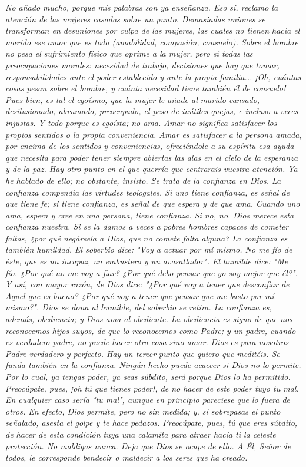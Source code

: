 \documentclass[12pt]{book} %
\begin{document}
\emph{No añado mucho, porque mis palabras son ya enseñanza. Eso sí, reclamo la atención de las mujeres casadas sobre un punto. Demasiadas uniones se transforman en desuniones por culpa de las mujeres, las cuales no tienen hacia el marido ese amor que es todo (amabilidad, compasión, consuelo). Sobre el hombre no pesa el sufrimiento físico que oprime a la mujer, pero sí todas las preocupaciones morales: necesidad de trabajo, decisiones que hay que tomar, responsabilidades ante el poder establecido y ante la propia familia... ¡Oh, cuántas cosas pesan sobre el hombre, y cuánta necesidad tiene también él de consuelo! Pues bien, es tal el egoísmo, que la mujer le añade al marido cansado, desilusionado, abrumado, preocupado, el peso de inútiles quejas, e incluso a veces injustas. Y todo porque es egoísta; no ama. Amar no significa satisfacer los propios sentidos o la propia conveniencia. Amar es satisfacer a la persona amada, por encima de los sentidos y conveniencias, ofreciéndole a su espíritu esa ayuda que necesita para poder tener siempre abiertas las alas en el cielo de la esperanza y de la paz. Hay otro punto en el que querría que centrarais vuestra atención. Ya he hablado de ello; no obstante, insisto. Se trata de la confianza en Dios. La confianza compendia las virtudes teologales. Si uno tiene confianza, es señal de que tiene fe; si tiene confianza, es señal de que espera y de que ama. Cuando uno ama, espera y cree en una persona, tiene confianza. Si no, no. Dios merece esta confianza nuestra. Si se la damos a veces a pobres hombres capaces de cometer faltas, ¿por qué negársela a Dios, que no comete falta alguna? La confianza es también humildad. El soberbio dice: "Voy a actuar por mí mismo. No me fío de éste, que es un incapaz, un embustero y un avasallador". El humilde dice: "Me fío. ¿Por qué no me voy a fiar? ¿Por qué debo pensar que yo soy mejor que él?". Y así, con mayor razón, de Dios dice: "¿Por qué voy a tener que desconfiar de Aquel que es bueno? ¿Por qué voy a tener que pensar que me basto por mí mismo?". Dios se dona al humilde, del soberbio se retira. La confianza es, además, obediencia; y Dios ama al obediente. La obediencia es signo de que nos reconocemos hijos suyos, de que lo reconocemos como Padre; y un padre, cuando es verdadero padre, no puede hacer otra cosa sino amar. Dios es para nosotros Padre verdadero y perfecto. Hay un tercer punto que quiero que meditéis. Se funda también en la confianza. Ningún hecho puede acaecer si Dios no lo permite. Por lo cual, ya tengas poder, ya seas súbdito, será porque Dios lo ha permitido. Preocúpate, pues, ¡oh tú que tienes poder!, de no hacer de este poder tuyo tu mal. En cualquier caso sería "tu mal", aunque en principio pareciese que lo fuera de otros. En efecto, Dios permite, pero no sin medida; y, si sobrepasas el punto señalado, asesta el golpe y te hace pedazos. Preocúpate, pues, tú que eres súbdito, de hacer de esta condición tuya una calamita para atraer hacia ti la celeste protección. No maldigas nunca. Deja que Dios se ocupe de ello. A Él, Señor de todos, le corresponde bendecir o maldecir a los seres que ha creado. }
\end{document}
